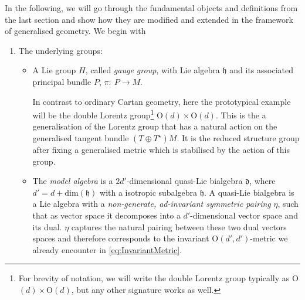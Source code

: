 \documentclass[11pt,a4paper]{article}
\numberwithin{equation}{section}
\begin{document}
In the following, we will go through the fundamental objects and definitions from the last section and show how they are modified and extended in the framework of generalised geometry. We begin with
\begin{enumerate}
    \item The underlying groups:
    \begin{itemize}
        \item A Lie group $H$, called \textit{gauge group}, with Lie algebra $\mathfrak{h}$ and its associated principal bundle $P$, $\pi: \ P \rightarrow M$.
        
        In contrast to ordinary Cartan geometry, here the prototypical example will be the double Lorentz group\footnote{For brevity of notation, we will write the double Lorentz group typically as O$(d)\times$O$(d)$, but any other signature works as well.} O$(d) \times$O$(d)$. This is the a generalisation of the Lorentz group that has a natural action on the generalised tangent bundle $(T\oplus T^\star)M$. It is the reduced structure group after fixing a generalised metric which is stabilised by the action of this group.
        
      \item The \textit{model algebra} is a $2d'$-dimensional quasi-Lie bialgebra $\mathfrak{d}$, where $d' = d + \text{dim}(\mathfrak{h})$ with a isotropic subalgebra $\mathfrak{h}$. A quasi-Lie bialgebra is a Lie algebra with a \textit{non-generate, ad-invariant symmetric pairing} $\eta$, such that as vector space it decomposes into a $d'$-dimensional vector space and its dual. $\eta$ captures the natural pairing between these two dual vectors spaces and therefore corresponds to the invariant O$(d',d')$-metric we already encounter in \eqref{eq:InvariantMetric}. 
        

\end{itemize}
\end{enumerate}
\end{document}
